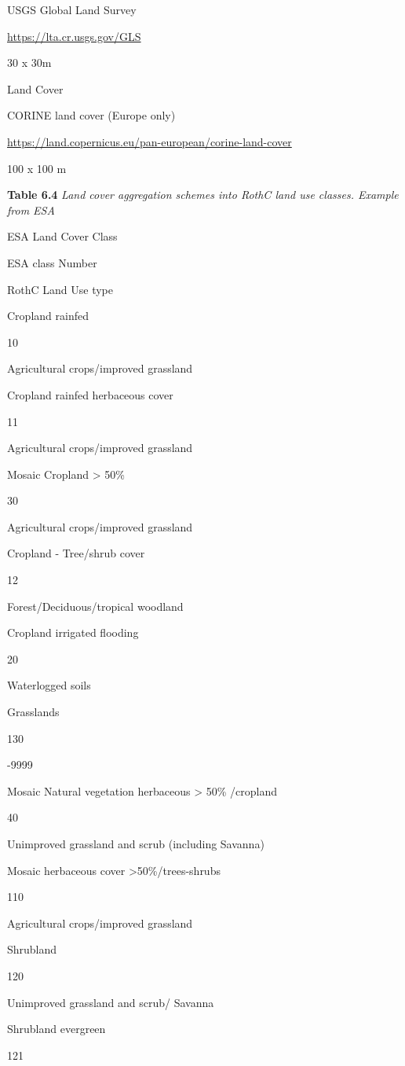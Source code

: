 \documentclass[
  10pt,
  b5paper,
]{book}
\begin{document}
USGS Global Land Survey

\url{https://lta.cr.usgs.gov/GLS}

30 x 30m

Land Cover

CORINE land cover (Europe only)

\url{https://land.copernicus.eu/pan-european/corine-land-cover}

100 x 100 m

\textbf{Table 6.4} \emph{Land cover aggregation schemes into RothC land use classes. Example from ESA}

ESA Land Cover Class

ESA class Number

RothC Land Use type

Cropland rainfed

10

Agricultural crops/improved grassland

Cropland rainfed herbaceous cover

11

Agricultural crops/improved grassland

Mosaic Cropland \textgreater{} 50\%

30

Agricultural crops/improved grassland

Cropland - Tree/shrub cover

12

Forest/Deciduous/tropical woodland

Cropland irrigated flooding

20

Waterlogged soils

Grasslands

130

-9999

Mosaic Natural vegetation herbaceous \textgreater{} 50\% /cropland

40

Unimproved grassland and scrub (including Savanna)

Mosaic herbaceous cover \textgreater50\%/trees-shrubs

110

Agricultural crops/improved grassland

Shrubland

120

Unimproved grassland and scrub/ Savanna

Shrubland evergreen

121
\end{document}
